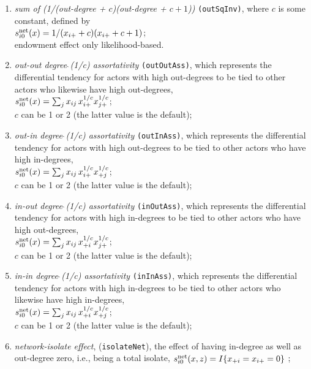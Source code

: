 \documentclass[a4paper,fleqn,11pt]{article}
\newcommand{\+}{\, + \,}
\newcommand{\vit}{\theenumi}
\begin{document}
\begin{enumerate}
 \item {\em sum of (1/(out-degree + $c$)(out-degree + $c+1$))} \texttt{(outSqInv)},
 where $c$ is some constant, defined by  \\
 $s^{\rm net}_{i\vit}(x) = 1/(x_{i+} + c)(x_{i+} + c + 1)$;\\
 endowment effect only likelihood-based.

 \item {\em out-out degree$\,\hat{\ }$(1/c) assortativity}
 \texttt{(outOutAss)},
 which represents the differential tendency for actors with high out-degrees
 to be tied to other actors who likewise have high out-degrees,\\
 $s^{\rm net}_{i\vit}(x) = \sum_j x_{ij}\, {x_{i+}^{1/c}} {x_{j+}^{1/c}} $;\\
 $c$ can be 1 or 2 (the latter value is the default);

 \item {\em out-in degree$\,\hat{\ }$(1/c) assortativity}
 \texttt{(outInAss)},
 which represents the differential tendency for actors with high out-degrees
 to be tied to other actors who have high in-degrees,\\
 $s^{\rm net}_{i\vit}(x) = \sum_j x_{ij}\, {x_{i+}^{1/c}} {x_{+j}^{1/c}} $;\\
 $c$ can be 1 or 2 (the latter value is the default);

 \item {\em in-out degree$\,\hat{\ }$(1/c) assortativity}
 \texttt{(inOutAss)},
 which represents the differential tendency for actors with high in-degrees
 to be tied to other actors who have high out-degrees,\\
 $s^{\rm net}_{i\vit}(x) = \sum_j x_{ij}\, {x_{+i}^{1/c}} {x_{j+}^{1/c}} $;\\
 $c$ can be 1 or 2 (the latter value is the default);

 \item {\em in-in degree$\,\hat{\ }$(1/c) assortativity}
 \texttt{(inInAss)},
 which represents the differential tendency for actors with high in-degrees
 to be tied to other actors who likewise have high in-degrees,\\
 $s^{\rm net}_{i\vit}(x) = \sum_j x_{ij}\, {x_{+i}^{1/c}} {x_{+j}^{1/c}} $;\\
 $c$ can be 1 or 2 (the latter value is the default);

\item \emph{network-isolate effect}, (\texttt{isolateNet}), the effect of having
      in-degree as well as out-degree zero, i.e., being a total isolate,
 $s^{\rm net}_{i\vit}(x, z) =   I\{x_{+i} = x_{i+} = 0 \}  $ ;


\end{enumerate}
\end{document}
